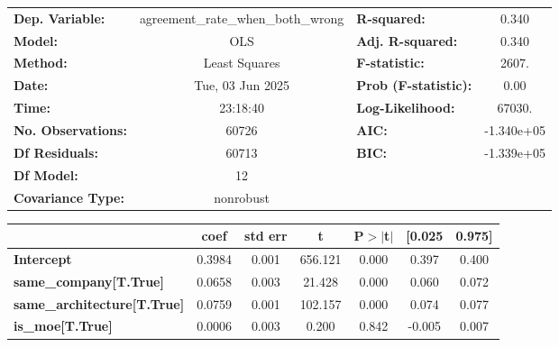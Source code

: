 \begin{center}
\begin{tabular}{lclc}
\toprule
\textbf{Dep. Variable:}             & agreement\_rate\_when\_both\_wrong & \textbf{  R-squared:         } &     0.340   \\
\textbf{Model:}                     &                OLS                 & \textbf{  Adj. R-squared:    } &     0.340   \\
\textbf{Method:}                    &           Least Squares            & \textbf{  F-statistic:       } &     2607.   \\
\textbf{Date:}                      &          Tue, 03 Jun 2025          & \textbf{  Prob (F-statistic):} &     0.00    \\
\textbf{Time:}                      &              23:18:40              & \textbf{  Log-Likelihood:    } &    67030.   \\
\textbf{No. Observations:}          &                60726               & \textbf{  AIC:               } & -1.340e+05  \\
\textbf{Df Residuals:}              &                60713               & \textbf{  BIC:               } & -1.339e+05  \\
\textbf{Df Model:}                  &                   12               & \textbf{                     } &             \\
\textbf{Covariance Type:}           &             nonrobust              & \textbf{                     } &             \\
\bottomrule
\end{tabular}
\begin{tabular}{lcccccc}
                                    & \textbf{coef} & \textbf{std err} & \textbf{t} & \textbf{P$> |$t$|$} & \textbf{[0.025} & \textbf{0.975]}  \\
\midrule
\textbf{Intercept}                  &       0.3984  &        0.001     &   656.121  &         0.000        &        0.397    &        0.400     \\
\textbf{same\_company[T.True]}      &       0.0658  &        0.003     &    21.428  &         0.000        &        0.060    &        0.072     \\
\textbf{same\_architecture[T.True]} &       0.0759  &        0.001     &   102.157  &         0.000        &        0.074    &        0.077     \\
\textbf{is\_moe[T.True]}            &       0.0006  &        0.003     &     0.200  &         0.842        &       -0.005    &        0.007     \\

\end{tabular}
\end{center}
